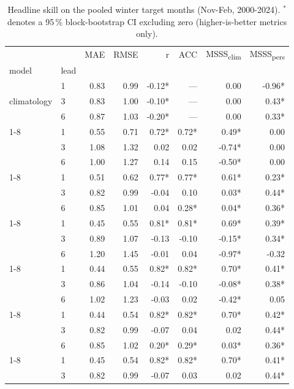 \begin{table}
\caption{Headline skill on the pooled winter target months (Nov-Feb, 2000-2024). $^*$ denotes a 95\,\% block-bootstrap CI excluding zero (higher-is-better metrics only).}
\label{tab:headline_skill}
\begin{tabular}{llrrrrrr}
\toprule
 &  & MAE & RMSE & r & ACC & MSSS\textsubscript{clim} & MSSS\textsubscript{pers} \\
model & lead &  &  &  &  &  &  \\
\midrule
\multirow[t]{3}{*}{climatology} & 1 & 0.83 & 0.99 & -0.12* & --- & 0.00 & -0.96* \\
 & 3 & 0.83 & 1.00 & -0.10* & --- & 0.00 & 0.43* \\
 & 6 & 0.87 & 1.03 & -0.20* & --- & 0.00 & 0.33* \\
\cline{1-8}
\multirow[t]{3}{*}{persistence} & 1 & 0.55 & 0.71 & 0.72* & 0.72* & 0.49* & 0.00 \\
 & 3 & 1.08 & 1.32 & 0.02 & 0.02 & -0.74* & 0.00 \\
 & 6 & 1.00 & 1.27 & 0.14 & 0.15 & -0.50* & 0.00 \\
\cline{1-8}
\multirow[t]{3}{*}{ar} & 1 & 0.51 & 0.62 & 0.77* & 0.77* & 0.61* & 0.23* \\
 & 3 & 0.82 & 0.99 & -0.04 & 0.10 & 0.03* & 0.44* \\
 & 6 & 0.85 & 1.01 & 0.04 & 0.28* & 0.04* & 0.36* \\
\cline{1-8}
\multirow[t]{3}{*}{ols} & 1 & 0.45 & 0.55 & 0.81* & 0.81* & 0.69* & 0.39* \\
 & 3 & 0.89 & 1.07 & -0.13 & -0.10 & -0.15* & 0.34* \\
 & 6 & 1.20 & 1.45 & -0.01 & 0.04 & -0.97* & -0.32 \\
\cline{1-8}
\multirow[t]{3}{*}{ridge} & 1 & 0.44 & 0.55 & 0.82* & 0.82* & 0.70* & 0.41* \\
 & 3 & 0.86 & 1.04 & -0.14 & -0.10 & -0.08* & 0.38* \\
 & 6 & 1.02 & 1.23 & -0.03 & 0.02 & -0.42* & 0.05 \\
\cline{1-8}
\multirow[t]{3}{*}{lasso} & 1 & 0.44 & 0.54 & 0.82* & 0.82* & 0.70* & 0.42* \\
 & 3 & 0.82 & 0.99 & -0.07 & 0.04 & 0.02 & 0.44* \\
 & 6 & 0.85 & 1.02 & 0.20* & 0.29* & 0.03* & 0.36* \\
\cline{1-8}
\multirow[t]{3}{*}{elasticnet} & 1 & 0.45 & 0.54 & 0.82* & 0.82* & 0.70* & 0.41* \\
 & 3 & 0.82 & 0.99 & -0.07 & 0.03 & 0.02 & 0.44* \\

\end{tabular}
\end{table}
